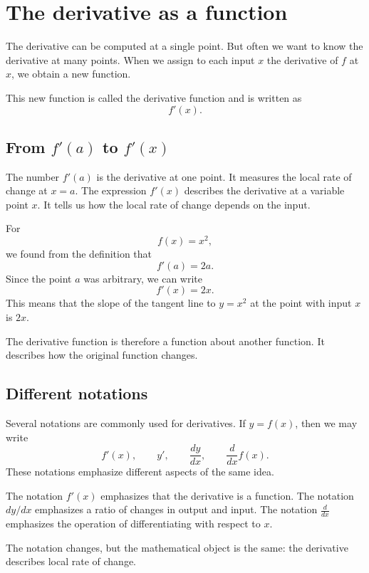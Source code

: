 \section{The derivative as a function}

The derivative can be computed at a single point. But often we want to know the derivative at many points. When we assign to each input \(x\) the derivative of \(f\) at \(x\), we obtain a new function.

This new function is called the derivative function and is written as
\[
f'(x).
\]

\subsection*{From \(f'(a)\) to \(f'(x)\)}

The number \(f'(a)\) is the derivative at one point. It measures the local rate of change at \(x=a\). The expression \(f'(x)\) describes the derivative at a variable point \(x\). It tells us how the local rate of change depends on the input.

\begin{examplebox}
For
\[
f(x)=x^2,
\]
we found from the definition that
\[
f'(a)=2a.
\]
Since the point \(a\) was arbitrary, we can write
\[
f'(x)=2x.
\]
This means that the slope of the tangent line to \(y=x^2\) at the point with input \(x\) is \(2x\).
\end{examplebox}

The derivative function is therefore a function about another function. It describes how the original function changes.

\subsection*{Different notations}

Several notations are commonly used for derivatives. If \(y=f(x)\), then we may write
\[
f'(x),
\qquad
 y',
\qquad
\frac{dy}{dx},
\qquad
\frac{d}{dx}f(x).
\]
These notations emphasize different aspects of the same idea.

The notation \(f'(x)\) emphasizes that the derivative is a function. The notation \(dy/dx\) emphasizes a ratio of changes in output and input. The notation \(\frac{d}{dx}\) emphasizes the operation of differentiating with respect to \(x\).

\begin{remarkbox}
The notation changes, but the mathematical object is the same: the derivative describes local rate of change.
\end{remarkbox}

